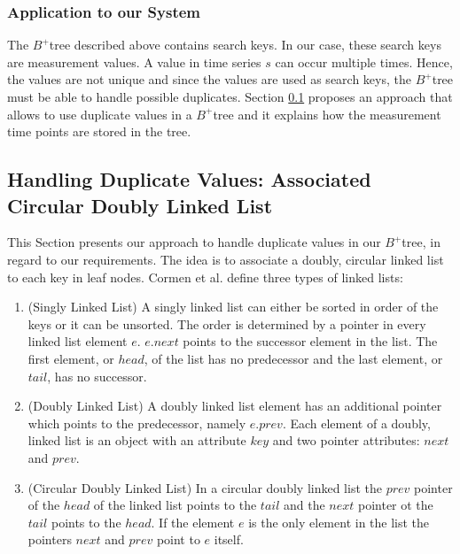 \documentclass[abstracton,12pt,oneside]{scrreprt}
\begin{document}
\subsubsection{Application to our System}
The $B^+$tree described above contains search keys. In our case, these search keys are measurement values. A value in time series $s$ can occur multiple times. Hence, the values are not unique and since the values are used as search keys, the $B^+$tree must be able to handle possible duplicates. Section \ref{sec:allowDV} proposes an approach that allows to use duplicate values in a $B^+$tree and it explains how the measurement time points are stored in the tree. 


\subsection{Handling Duplicate Values: Associated Circular Doubly Linked List}
\label{sec:allowDV}
This Section presents our approach to handle duplicate values in our $B^+$tree, in regard to our requirements. 
\label{doublyLinked}
The idea is to associate a doubly, circular linked list to each key in leaf nodes. Cormen et al.\cite{LinkedListBook} define three types of linked lists:
\begin{enumerate}
	\item (Singly Linked List) A singly linked list can either be sorted in order of the keys or it can be unsorted. The order is determined by a pointer in every linked list element $e$. $e.next$ points to the successor element in the list. The first element, or $head$, of the list has no predecessor and the last element, or $tail$, has no successor. 
	\item (Doubly Linked List) A doubly linked list element has an additional pointer which points to the predecessor, namely $e.prev$. Each element of a doubly, linked list is an object with an attribute $key$ and two pointer attributes: $next$ and $prev$.
	\item (Circular Doubly Linked List) In a circular doubly linked list the $prev$ pointer of the $head$ of the linked list points to the $tail$ and the $next$ pointer ot the $tail$ points to the $head$. If the element $e$ is the only element in the list the pointers $next$ and $prev$ point to $e$ itself. 
\end{enumerate}
\end{document}
